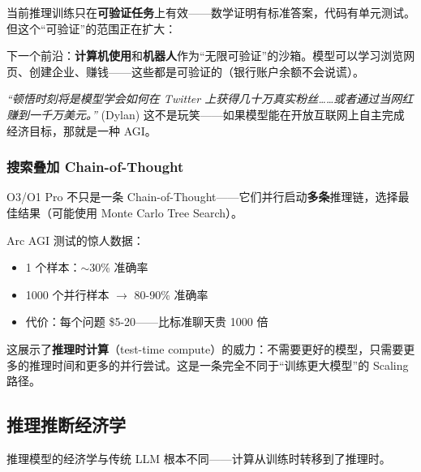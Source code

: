 当前推理训练只在\textbf{可验证任务}上有效——数学证明有标准答案，代码有单元测试。但这个``可验证''的范围正在扩大：

下一个前沿：\textbf{计算机使用}和\textbf{机器人}作为``无限可验证''的沙箱。模型可以学习浏览网页、创建企业、赚钱——这些都是可验证的（银行账户余额不会说谎）。

\textit{``顿悟时刻将是模型学会如何在 Twitter 上获得几十万真实粉丝……或者通过当网红赚到一千万美元。''} (Dylan) 这不是玩笑——如果模型能在开放互联网上自主完成经济目标，那就是一种 AGI。

\subsubsection{搜索叠加 Chain-of-Thought}

O3/O1 Pro 不只是一条 Chain-of-Thought——它们并行启动\textbf{多条}推理链，选择最佳结果（可能使用 Monte Carlo Tree Search）。

Arc AGI 测试的惊人数据：
\begin{itemize}
    \item 1 个样本：$\sim$30\% 准确率
    \item 1000 个并行样本 $\to$ 80-90\% 准确率
    \item 代价：每个问题 \$5-20——比标准聊天贵 1000 倍
\end{itemize}

这展示了\textbf{推理时计算}（test-time compute）的威力：不需要更好的模型，只需要更多的推理时间和更多的并行尝试。这是一条完全不同于``训练更大模型''的 Scaling 路径。

\subsection{推理推断经济学}

推理模型的经济学与传统 LLM 根本不同——计算从训练时转移到了推理时。

